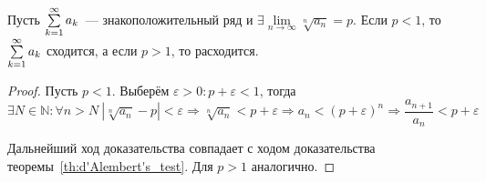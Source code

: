 \begin{theorem}
Пусть $\sum\limits_{k=1}^\infty a_k$~--- знакоположительный ряд и $\exists \lim\limits_{n \to \infty} \sqrt[n]{a_n} = p$.
Если $p < 1$, то $\sum\limits_{k=1}^\infty a_k$ сходится, а если $p > 1$, то расходится.
\end{theorem}
\begin{proof}
Пусть $p < 1$.
Выберём $\varepsilon > 0 \colon p + \varepsilon < 1$, тогда
\begin{equation*}
\exists N \in \mathbb N \colon \forall n > N \ \left| \sqrt[n]{a_n} - p \right| < \varepsilon \Rightarrow
\sqrt[n]{a_n} < p + \varepsilon \Rightarrow
a_n < (p + \varepsilon)^n \Rightarrow
\frac{a_{n+1}}{a_n} < p + \varepsilon
\end{equation*}

Дальнейший ход доказательства совпадает с ходом доказательства теоремы~\ref*{th:d'Alembert's_test}.
Для $p > 1$ аналогично.
\end{proof}